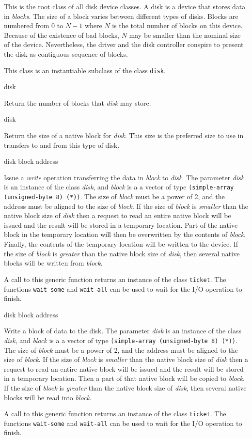 
This is the root class of all disk device classes.  A disk is a device
that stores data in \emph{blocks}.  The size of a block varies between
different types of disks.  Blocks are numbered from $0$ to $N-1$ where
$N$ is the total number of blocks on this device.  Because of the
existence of bad blocks, $N$ may be smaller than the nominal size of
the device.  Nevertheless, the driver and the disk controller conspire
to present the disk as contiguous sequence of blocks. 


This class is an instantiable subclass of the class \texttt{disk}. 

 {disk}

Return the number of blocks that \textit{disk} may store.

 {disk}

Return the size of a native block for \textit{disk}.  This size is the
preferred size to use in transfers to and from this type of disk.

 {disk block address}

Issue a \emph{write} operation transferring the data in \textit{block}
to \textit{disk}.  The parameter \textit{disk} is an
instance of the class \textit{disk}, and \textit{block} is a a vector
of type \texttt{(simple-array (unsigned-byte 8) (*))}.  The size of
\textit{block} must be a power of 2, and the address must be aligned
to the size of \textit{block}.  If the size of \textit{block} is
\emph{smaller} than the native block size of \textit{disk} then a
request to read an entire native block will be issued and the result
will be stored in a temporary location.  Part of the native block in
the temporary location will then be overwritten by the contents of
\textit{block}.  Finally, the contents of the temporary location will
be written to the device.  If the size of \textit{block} is
\emph{greater} than the native block size of \textit{disk}, then
several native blocks will be written from \textit{block}.

A call to this generic function returns an instance of the class
\texttt{ticket}.  The functions \texttt{wait-some} and
\texttt{wait-all} can be used to wait for the I/O operation to finish.

 {disk block address}

Write a block of data to the disk.  The parameter \textit{disk} is an
instance of the class \textit{disk}, and \textit{block} is a a vector
of type \texttt{(simple-array (unsigned-byte 8) (*))}.  The size of
\textit{block} must be a power of 2, and the address must be aligned
to the size of \textit{block}.  If the size of \textit{block} is
\emph{smaller} than the native block size of \textit{disk} then a
request to read an entire native block will be issued and the result
will be stored in a temporary location.  Then a part of that native
block will be copied to \textit{block}.  If the size of \textit{block}
is \emph{greater} than the native block size of \textit{disk}, then
several native blocks will be read into \textit{block}.

A call to this generic function returns an instance of the class
\texttt{ticket}.  The functions \texttt{wait-some} and
\texttt{wait-all} can be used to wait for the I/O operation to finish.

